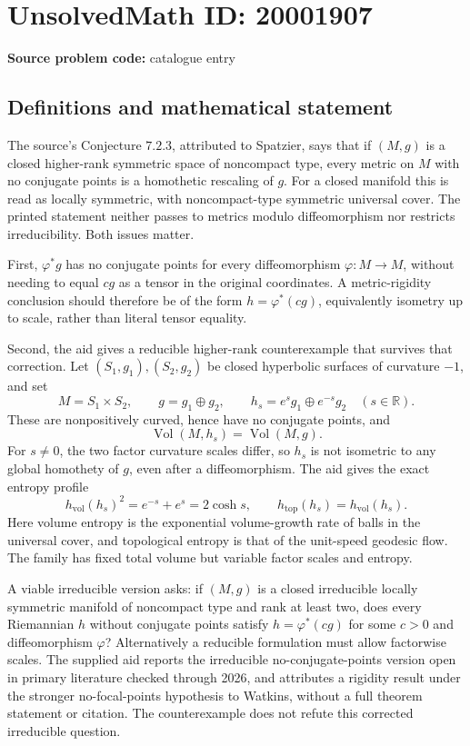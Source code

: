 \documentclass[11pt]{article}
\newcommand{\R}{\mathbb{R}}
\begin{document}
\section*{UnsolvedMath ID: 20001907}
\textbf{Source problem code:} catalogue entry
\subsection{Definitions and mathematical statement}
The source's Conjecture \(7.2.3\), attributed to Spatzier, says that if \((M,g)\) is a closed higher-rank symmetric space of noncompact type, every metric on \(M\) with no conjugate points is a homothetic rescaling of \(g\). For a closed manifold this is read as locally symmetric, with noncompact-type symmetric universal cover. The printed statement neither passes to metrics modulo diffeomorphism nor restricts irreducibility. Both issues matter.

First, \(\varphi^*g\) has no conjugate points for every diffeomorphism \(\varphi:M\to M\), without needing to equal \(cg\) as a tensor in the original coordinates. A metric-rigidity conclusion should therefore be of the form \(h=\varphi^*(cg)\), equivalently isometry up to scale, rather than literal tensor equality.

Second, the aid gives a reducible higher-rank counterexample that survives that correction. Let \((S_1,g_1),(S_2,g_2)\) be closed hyperbolic surfaces of curvature \(-1\), and set
\[
 M=S_1\times S_2,\qquad g=g_1\oplus g_2,\qquad
 h_s=e^s g_1\oplus e^{-s}g_2\quad(s\in\R).
\]
These are nonpositively curved, hence have no conjugate points, and
\[
 \operatorname{Vol}(M,h_s)=\operatorname{Vol}(M,g).
\]
For \(s\ne0\), the two factor curvature scales differ, so \(h_s\) is not isometric to any global homothety of \(g\), even after a diffeomorphism. The aid gives the exact entropy profile
\[
 h_{\mathrm{vol}}(h_s)^2=e^{-s}+e^s=2\cosh s,
 \qquad h_{\mathrm{top}}(h_s)=h_{\mathrm{vol}}(h_s).
\]
Here volume entropy is the exponential volume-growth rate of balls in the universal cover, and topological entropy is that of the unit-speed geodesic flow. The family has fixed total volume but variable factor scales and entropy.

A viable irreducible version asks: if \((M,g)\) is a closed irreducible locally symmetric manifold of noncompact type and rank at least two, does every Riemannian \(h\) without conjugate points satisfy \(h=\varphi^*(cg)\) for some \(c>0\) and diffeomorphism \(\varphi\)? Alternatively a reducible formulation must allow factorwise scales. The supplied aid reports the irreducible no-conjugate-points version open in primary literature checked through 2026, and attributes a rigidity result under the stronger no-focal-points hypothesis to Watkins, without a full theorem statement or citation. The counterexample does not refute this corrected irreducible question.
\end{document}
